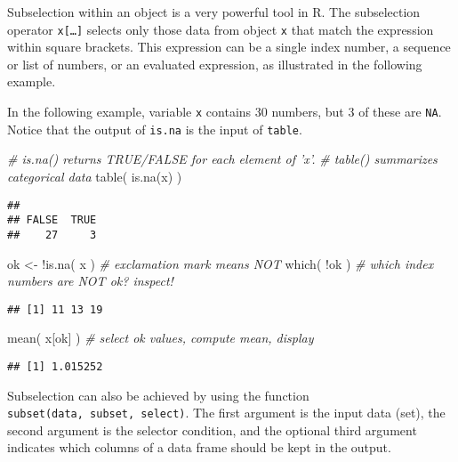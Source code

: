 \documentclass[
]{book}
\newenvironment{Shaded}{\begin{snugshade}}{\end{snugshade}}
\newcommand{\CommentTok}[1]{\textcolor[rgb]{0.56,0.35,0.01}{\textit{#1}}}
\newcommand{\FunctionTok}[1]{\textcolor[rgb]{0.00,0.00,0.00}{#1}}
\newcommand{\NormalTok}[1]{#1}
\newcommand{\OtherTok}[1]{\textcolor[rgb]{0.56,0.35,0.01}{#1}}
\newcommand{\SpecialCharTok}[1]{\textcolor[rgb]{0.00,0.00,0.00}{#1}}
\begin{document}
Subselection within an object is a very powerful tool in
R. The subselection operator \texttt{x{[}…{]}} selects only those data from object \texttt{x}
that match the expression within square brackets. This expression can be a
single index number, a sequence or list of numbers, or an evaluated
expression, as illustrated in the following example.

In the following example, variable \texttt{x} contains
30 numbers, but 3 of these are \texttt{NA}. Notice that
the output of \texttt{is.na} is the input of
\texttt{table}.

\begin{Shaded}
\begin{Highlighting}[]
\CommentTok{\# is.na() returns TRUE/FALSE for each element of ’x’. }
\CommentTok{\# table() summarizes categorical data }
\FunctionTok{table}\NormalTok{( }\FunctionTok{is.na}\NormalTok{(x) ) }
\end{Highlighting}
\end{Shaded}

\begin{verbatim}
## 
## FALSE  TRUE 
##    27     3
\end{verbatim}

\begin{Shaded}
\begin{Highlighting}[]
\NormalTok{ok }\OtherTok{\textless{}{-}} \SpecialCharTok{!}\FunctionTok{is.na}\NormalTok{( x ) }\CommentTok{\# exclamation mark means NOT }
\FunctionTok{which}\NormalTok{( }\SpecialCharTok{!}\NormalTok{ok ) }\CommentTok{\# which index numbers are NOT ok? inspect! }
\end{Highlighting}
\end{Shaded}

\begin{verbatim}
## [1] 11 13 19
\end{verbatim}

\begin{Shaded}
\begin{Highlighting}[]
\FunctionTok{mean}\NormalTok{( x[ok] ) }\CommentTok{\# select ok values, compute mean, display }
\end{Highlighting}
\end{Shaded}

\begin{verbatim}
## [1] 1.015252
\end{verbatim}

Subselection can also be achieved by using the function
\texttt{subset(data,\ subset,\ select)}. The first
argument is the input data (set), the second argument is the selector
condition, and the optional third argument indicates which columns of a
data frame should be kept in the output.
\end{document}

